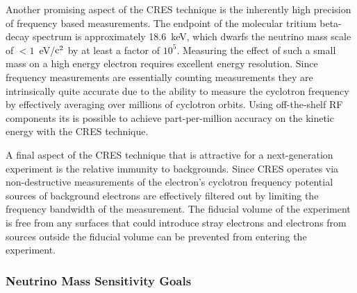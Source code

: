 Another promising aspect of the CRES technique is the inherently high precision of frequency based measurements. The endpoint of the molecular tritium beta-decay spectrum is approximately 18.6~keV, which dwarfs the neutrino mass scale of $<1$~eV/$\rm{c}^2$ by at least a factor of $10^5$. Measuring the effect of such a small mass on a high energy electron requires excellent energy resolution. Since frequency measurements are essentially counting measurements they are intrinsically quite accurate due to the ability to measure the cyclotron frequency by effectively averaging over millions of cyclotron orbits. Using off-the-shelf RF components its is possible to achieve part-per-million accuracy on the kinetic energy with the CRES technique.

A final aspect of the CRES technique that is attractive for a next-generation experiment is the relative immunity to backgrounds. Since CRES operates via non-destructive measurements of the electron's cyclotron frequency potential sources of background electrons are effectively filtered out by limiting the frequency bandwidth of the measurement. The fiducial volume of the experiment is free from any surfaces that could introduce stray electrons and electrons from sources outside the fiducial volume can be prevented from entering the experiment.

\subsubsection*{Neutrino Mass Sensitivity Goals}

